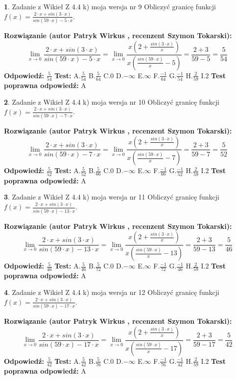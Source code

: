 \documentclass[12pt, a4paper]{article}
\theoremstyle{definition} %
\newtheorem{zad}{}
\newcommand{\zadStart}[1]{\begin{zad}#1\newline}
\newcommand{\zadStop}{\end{zad}}
\newcommand{\rozwStart}[2]{\noindent \textbf{Rozwiązanie (autor #1 , recenzent #2): }\newline}
\newcommand{\rozwStop}{\newline}
\newcommand{\odpStart}{\noindent \textbf{Odpowiedź:}\newline}
\newcommand{\odpStop}{\newline}
\newcommand{\testStart}{\noindent \textbf{Test:}\newline}
\newcommand{\testStop}{\newline}
\newcommand{\kluczStart}{\noindent \textbf{Test poprawna odpowiedź:}\newline}
\newcommand{\kluczStop}{\newline}
\begin{document}
\zadStart{Zadanie z Wikieł Z 4.4 k) moja wersja nr 9}
Obliczyć granicę funkcji $f(x)=\frac{2\cdot x +sin(3\cdot x)}{sin(59\cdot x) -5\cdot x}$.
\zadStop
\rozwStart{Patryk Wirkus}{Szymon Tokarski}
$$\lim\limits_{x\to 0}\frac{2\cdot x +sin(3\cdot x)}{sin(59\cdot x) -5\cdot x}
=\lim\limits_{x\to 0}\frac{x(2+\frac{sin(3\cdot x)}{x})}{x(\frac{sin(59\cdot x)}{x}-5)}
=\frac{2+3}{59-5} = \frac{5}{54}$$
\rozwStop
\odpStart
$\frac{5}{54}$
\odpStop
\testStart
A.$\frac{5}{54}$
B.$\frac{5}{64}$
C.$0$
D.$-\infty$
E.$\infty$
F.$\frac{-1}{64}$
G.$\frac{-1}{54}$
H.$\frac{2}{59}$
I.$2$
\testStop
\kluczStart
A
\kluczStop



\zadStart{Zadanie z Wikieł Z 4.4 k) moja wersja nr 10}
Obliczyć granicę funkcji $f(x)=\frac{2\cdot x +sin(3\cdot x)}{sin(59\cdot x) -7\cdot x}$.
\zadStop
\rozwStart{Patryk Wirkus}{Szymon Tokarski}
$$\lim\limits_{x\to 0}\frac{2\cdot x +sin(3\cdot x)}{sin(59\cdot x) -7\cdot x}
=\lim\limits_{x\to 0}\frac{x(2+\frac{sin(3\cdot x)}{x})}{x(\frac{sin(59\cdot x)}{x}-7)}
=\frac{2+3}{59-7} = \frac{5}{52}$$
\rozwStop
\odpStart
$\frac{5}{52}$
\odpStop
\testStart
A.$\frac{5}{52}$
B.$\frac{5}{66}$
C.$0$
D.$-\infty$
E.$\infty$
F.$\frac{-1}{66}$
G.$\frac{-1}{52}$
H.$\frac{2}{59}$
I.$2$
\testStop
\kluczStart
A
\kluczStop



\zadStart{Zadanie z Wikieł Z 4.4 k) moja wersja nr 11}
Obliczyć granicę funkcji $f(x)=\frac{2\cdot x +sin(3\cdot x)}{sin(59\cdot x) -13\cdot x}$.
\zadStop
\rozwStart{Patryk Wirkus}{Szymon Tokarski}
$$\lim\limits_{x\to 0}\frac{2\cdot x +sin(3\cdot x)}{sin(59\cdot x) -13\cdot x}
=\lim\limits_{x\to 0}\frac{x(2+\frac{sin(3\cdot x)}{x})}{x(\frac{sin(59\cdot x)}{x}-13)}
=\frac{2+3}{59-13} = \frac{5}{46}$$
\rozwStop
\odpStart
$\frac{5}{46}$
\odpStop
\testStart
A.$\frac{5}{46}$
B.$\frac{5}{72}$
C.$0$
D.$-\infty$
E.$\infty$
F.$\frac{-1}{72}$
G.$\frac{-1}{46}$
H.$\frac{2}{59}$
I.$2$
\testStop
\kluczStart
A
\kluczStop



\zadStart{Zadanie z Wikieł Z 4.4 k) moja wersja nr 12}
Obliczyć granicę funkcji $f(x)=\frac{2\cdot x +sin(3\cdot x)}{sin(59\cdot x) -17\cdot x}$.
\zadStop
\rozwStart{Patryk Wirkus}{Szymon Tokarski}
$$\lim\limits_{x\to 0}\frac{2\cdot x +sin(3\cdot x)}{sin(59\cdot x) -17\cdot x}
=\lim\limits_{x\to 0}\frac{x(2+\frac{sin(3\cdot x)}{x})}{x(\frac{sin(59\cdot x)}{x}-17)}
=\frac{2+3}{59-17} = \frac{5}{42}$$
\rozwStop
\odpStart
$\frac{5}{42}$
\odpStop
\testStart
A.$\frac{5}{42}$
B.$\frac{5}{76}$
C.$0$
D.$-\infty$
E.$\infty$
F.$\frac{-1}{76}$
G.$\frac{-1}{42}$
H.$\frac{2}{59}$
I.$2$
\testStop
\kluczStart
A
\kluczStop
\end{document}

